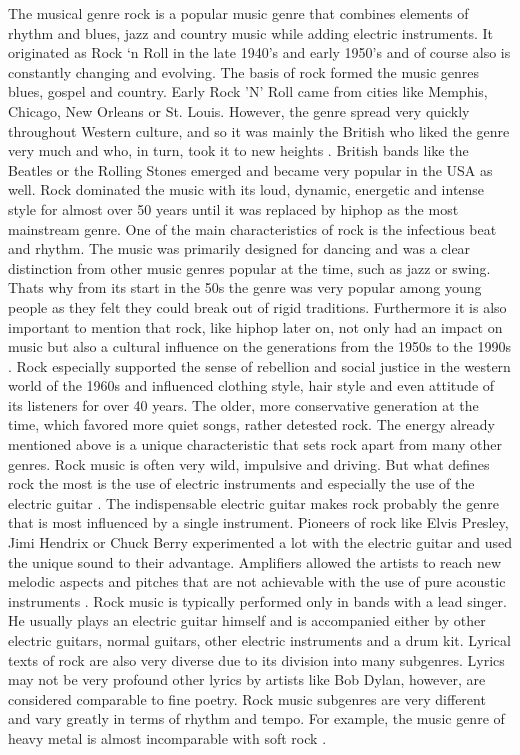 The musical genre rock is a popular music genre that combines elements of rhythm and blues,
jazz and country music while adding electric instruments.
It originated as Rock `n Roll in the late 1940's and early 1950's and of course also is constantly
changing and evolving.
The basis of rock formed the music genres blues, gospel and country.
Early Rock 'N' Roll came from cities like Memphis, Chicago, New Orleans or St. Louis.
However, the genre spread very quickly throughout Western culture, and so it was mainly
the British who liked the genre very much and who, in turn, took it to new heights \cite{2021MasterclassRock}.
British bands like the Beatles or the Rolling Stones emerged and became very popular in the USA as well.
Rock dominated the music with its loud, dynamic, energetic and intense style for almost over
50 years until it was replaced by hiphop as the most mainstream genre.
One of the main characteristics of rock is the infectious beat and rhythm.
The music was primarily designed for dancing and was a clear distinction from other music genres
popular at the time, such as jazz or swing.
Thats why from its start in the 50s the genre was very popular among young people as they felt
they could break out of rigid traditions.
Furthermore it is also important to mention that rock, like hiphop later on,
not only had an impact on music but also a cultural influence on the generations
from the 1950s to the 1990s \cite{2021MasterclassRock}. Rock especially supported the sense of rebellion and social
justice in the western world of the 1960s and influenced clothing style,
hair style and even attitude of its listeners for over 40 years.
The older, more conservative generation at the time, which favored more quiet songs,
rather detested rock.
The energy already mentioned above is a unique characteristic that sets rock apart
from many other genres. Rock music is often very wild, impulsive and driving.
But what defines rock the most is the use of electric instruments and especially
the use of the electric guitar \cite{MusicalDictRock}.
The indispensable electric guitar makes rock probably the genre that is most
influenced by a single instrument. Pioneers of rock like Elvis Presley,
Jimi Hendrix or Chuck Berry experimented a lot with the electric guitar
and used the unique sound to their advantage.
Amplifiers allowed the artists to reach new melodic aspects and pitches that are not achievable
with the use of pure acoustic instruments \cite{MusicalDictRock}. Rock music is typically performed only in bands with a lead singer.
He usually plays an electric guitar himself and is accompanied either by other electric guitars,
normal guitars, other electric instruments and a drum kit.
Lyrical texts of rock are also very diverse due to its division into many subgenres.
Lyrics may not be very profound other lyrics by artists like Bob Dylan, however,
are considered comparable to fine poetry.
Rock music subgenres are very different and vary greatly in terms of rhythm and tempo.
For example, the music genre of heavy metal is almost incomparable with soft rock \cite{Clark2021}.